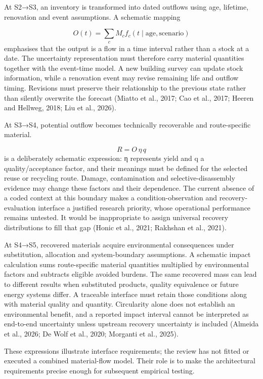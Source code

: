 At S2→S3, an inventory is transformed into dated outflows using age, lifetime, renovation and event assumptions. A schematic mapping 

\[
O(t)=\sum_c M_c f_c(t\mid\mathrm{age,scenario})
\]
 emphasises that the output is a flow in a time interval rather than a stock at a date. The uncertainty representation must therefore carry material quantities together with the event-time model. A new building survey can update stock information, while a renovation event may revise remaining life and outflow timing. Revisions must preserve their relationship to the previous state rather than silently overwrite the forecast (Miatto et al., 2017; Cao et al., 2017; Heeren and Hellweg, 2018; Liu et al., 2026).

At S3→S4, potential outflow becomes technically recoverable and route-specific material. 

\[
R=O\,\eta\,q
\]
 is a deliberately schematic expression: η represents yield and q a quality/acceptance factor, and their meanings must be defined for the selected reuse or recycling route. Damage, contamination and selective-disassembly evidence may change these factors and their dependence. The current absence of a coded context at this boundary makes a condition-observation and recovery-evaluation interface a justified research priority, whose operational performance remains untested. It would be inappropriate to assign universal recovery distributions to fill that gap (Honic et al., 2021; Rakhshan et al., 2021).

At S4→S5, recovered materials acquire environmental consequences under substitution, allocation and system-boundary assumptions. A schematic impact calculation sums route-specific material quantities multiplied by environmental factors and subtracts eligible avoided burdens. The same recovered mass can lead to different results when substituted products, quality equivalence or future energy systems differ. A traceable interface must retain those conditions along with material quality and quantity. Circularity alone does not establish an environmental benefit, and a reported impact interval cannot be interpreted as end-to-end uncertainty unless upstream recovery uncertainty is included (Almeida et al., 2026; De Wolf et al., 2020; Morganti et al., 2025).

These expressions illustrate interface requirements; the review has not fitted or executed a combined material-flow model. Their role is to make the architectural requirements precise enough for subsequent empirical testing.


